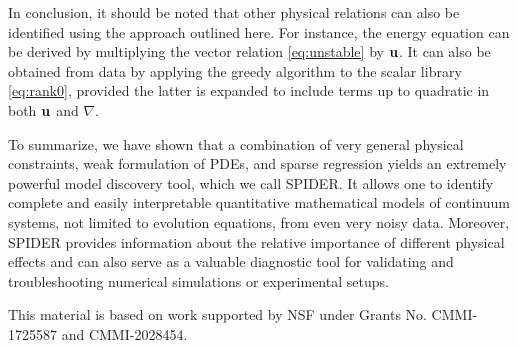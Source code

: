 \documentclass[
 reprint,
 amsmath,amssymb,
 aps,
]{revtex4-2}
\begin{document}
In conclusion, it should be noted that other physical relations can also be identified using the approach outlined here. For instance, the energy equation can be derived by multiplying the vector relation \eqref{eq:unstable} by ${\bf u}$. It can also be obtained from data by applying the greedy algorithm to the scalar library \eqref{eq:rank0}, provided the latter is expanded to include terms up to quadratic in both ${\bf u}$ and $\nabla$.

To summarize, we have shown that a combination of very general physical constraints, weak formulation of PDEs, and sparse regression yields an extremely powerful model discovery tool, which we call SPIDER. It allows one to identify complete and easily interpretable quantitative mathematical models of continuum systems, not limited to evolution equations, from even very noisy data.
Moreover, SPIDER provides information about the relative importance of different physical effects and can also serve as a valuable diagnostic tool for validating and troubleshooting numerical simulations or experimental setups.

This material is based on work supported by NSF under Grants No. CMMI-1725587 and CMMI-2028454. 

%

\end{document}
